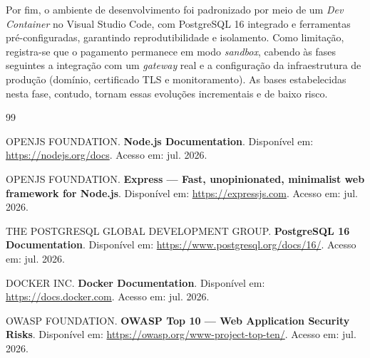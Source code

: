 \documentclass[a4paper,12pt]{article}
\begin{document}
Por fim, o ambiente de desenvolvimento foi padronizado por meio de um \emph{Dev
Container} no Visual Studio Code, com PostgreSQL 16 integrado e ferramentas
pré-configuradas, garantindo reprodutibilidade e isolamento. Como limitação, registra-se
que o pagamento permanece em modo \emph{sandbox}, cabendo às fases seguintes a integração
com um \emph{gateway} real e a configuração da infraestrutura de produção (domínio,
certificado TLS e monitoramento). As bases estabelecidas nesta fase, contudo, tornam
essas evoluções incrementais e de baixo risco.

\begin{thebibliography}{99}

OPENJS FOUNDATION. \textbf{Node.js Documentation}. Disponível em:
\url{https://nodejs.org/docs}. Acesso em: jul. 2026.

OPENJS FOUNDATION. \textbf{Express --- Fast, unopinionated, minimalist web framework for
Node.js}. Disponível em: \url{https://expressjs.com}. Acesso em: jul. 2026.

THE POSTGRESQL GLOBAL DEVELOPMENT GROUP. \textbf{PostgreSQL 16 Documentation}. Disponível
em: \url{https://www.postgresql.org/docs/16/}. Acesso em: jul. 2026.

DOCKER INC. \textbf{Docker Documentation}. Disponível em:
\url{https://docs.docker.com}. Acesso em: jul. 2026.

OWASP FOUNDATION. \textbf{OWASP Top 10 --- Web Application Security Risks}. Disponível em:
\url{https://owasp.org/www-project-top-ten/}. Acesso em: jul. 2026.

\end{thebibliography}
\end{document}
